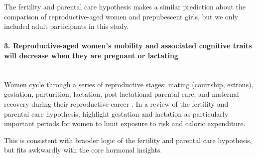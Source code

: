 

The fertility and parental care hypothesis makes a similar prediction about the comparison of reproductive-aged women and prepubescent girls, but we only included adult participants in this study.
  
\paragraph{3.  Reproductive-aged women's mobility and associated cognitive traits will decrease when they are pregnant or lactating}\mbox{}\\

Women cycle through a series of reproductive stages: mating (courtship, estrous), gestation, parturition, lactation, post-lactational parental care, and maternal recovery during their reproductive career \citep{gittleman1988energy}.  In a review of the fertility and parental care hypothesis, \citet{jones2003evolution} highlight gestation and lactation as particularly important periods for women to limit exposure to risk and caloric expenditure.

This is consistent with braoder logic of the fertility and parental care hypothesis, but fits awkwardly with the core hormonal insights.  

